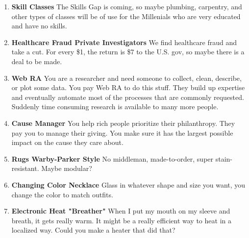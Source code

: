 \documentclass[paper=a4, fontsize=11pt]{scrartcl} %
\numberwithin{equation}{section} %
\numberwithin{figure}{section} %
\numberwithin{table}{section} %
\begin{document}
\begin{enumerate}
\item \textbf{Skill Classes}  The Skills Gap is coming, so maybe plumbing, carpentry, and other types of classes will be of use for the Millenials who are very educated and have no skills.  

\item \textbf{Healthcare Fraud Private Investigators} We find healthcare fraud and take a cut.  For every \$1, the return is \$7 to the U.S. gov, so maybe there is a deal to be made.

\item \textbf{Web RA} You are a researcher and need someone to collect, clean, describe, or plot some data.  You pay Web RA to do this stuff.  They build up expertise and eventually automate most of the processes that are commonly requested.  Suddenly time consuming research is available to many more people.  

\item \textbf{Cause Manager} You help rich people prioritize their philanthropy.  They pay you to manage their giving.  You make sure it has the largest possible impact on the cause they care about.

\item \textbf{Rugs Warby-Parker Style} No middleman, made-to-order, super stain-resistant.  Maybe modular?

\item \textbf{Changing Color Necklace}  Glass in whatever shape and size you want, you change the color to match outfits.  

\item \textbf{Electronic Heat "Breather"} When I put my mouth on my sleeve and breath, it gets really warm.  It might be a really efficient way to heat in a localized way.  Could you make a heater that did that?


\end{enumerate}
\end{document}
